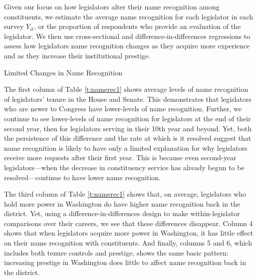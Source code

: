 \documentclass[12pt]{article}
\begin{document}
Given our focus on how legislators alter their name recognition among constituents, we estimate the average name recognition for each legislator in each survey $Y_{it}$, or the proportion of respondents who provide an evaluation of the legislator. We then use cross-sectional and difference-in-differences regressions to assess how legislators name recognition changes as they acquire more experience and as they increase their institutional prestige.  

\begin{table}[hbt!]
\caption{Limited Changes in Name Recognition} \label{t:namerec1}

\begin{minipage}{\textwidth}
\begin{center}

\end{center}
\end{minipage}
\end{table}


The first column of Table \ref{t:namerec1} shows average levels of name recognition of legislators' tenure in the House and Senate. This demonstrates that legislators who are newer to Congress have lower-levels of name recognition. Further, we continue to see lower-levels of name recognition for legislators at the end of their second year, then for legislators serving in their 10th year and beyond. Yet, both the persistence of this difference and the rate at which is it resolved suggest that name recognition is likely to have only a limited explanation for why legislators receive more requests after their first year. This is because even second-year legislators---when the decrease in constituency service has already begun to be resolved---continue to have lower name recognition.  


The third column of Table \ref{t:namerec1} shows that, on average, legislators who hold more power in Washington do have higher name recognition back in the district. Yet, using a difference-in-differences design to make within-legislator comparisons over their careers, we see that these differences disappear. Column 4 shows that when legislators acquire more power in Washington, it has little effect on their name recognition with constituents. And finally, columns 5 and 6, which includes both tenure controls and prestige, shows the same basic pattern: increasing prestige in Washington does little to affect name recognition back in the district.  
\end{document}

